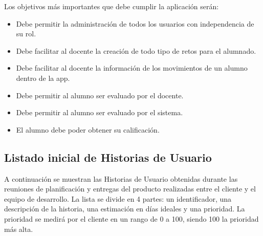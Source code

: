 Los objetivos más importantes que debe cumplir la aplicación serán:

\begin{itemize}
	\item Debe permitir la administración de todos los usuarios con independencia de su rol.
	\item Debe facilitar al docente la creación de todo tipo de retos para el alumnado.
	\item Debe facilitar al docente la información de los movimientos de un alumno dentro de la app.
	\item Debe permitir al alumno ser evaluado por el docente.
	\item Debe permitir al alumno ser evaluado por el sistema.
	\item El alumno debe poder obtener su calificación.
\end{itemize}

\subsection{Listado inicial de Historias de Usuario}

A continuación se muestran las Historias de Usuario obtenidas durante las reuniones de planificación y entregas del producto realizadas entre el cliente y el equipo de desarrollo. La lista se divide en 4 partes: un identificador, una descripción de la historia, una estimación en días ideales y una prioridad. La prioridad se medirá por el cliente en un rango de 0 a 100, siendo 100 la prioridad más alta.


